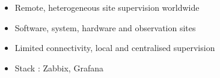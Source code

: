 \documentclass[10pt,a4paper,ragged2e,withhyper]{altacv}
\begin{document}
\begin{paracol}{2}
\begin{itemize}
\item Remote, heterogeneous site supervision worldwide
\item Software, system, hardware and observation sites
\item Limited connectivity, local and centralised supervision
\item Stack : Zabbix, Grafana

\end{itemize}











\end{paracol}
\end{document}
